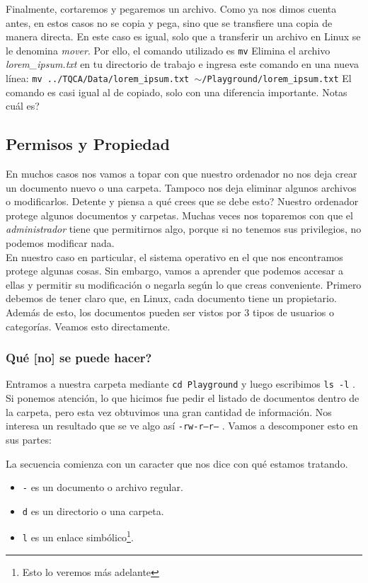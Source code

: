 \documentclass[10pt,letterpaper]{article}
\newcommand{\inlinecode}[1]{
\colorbox{light-gray}{\texttt{#1}}
}
\begin{document}
Finalmente, cortaremos y pegaremos un archivo. Como ya nos dimos cuenta antes, en estos casos no se copia y pega, sino que se transfiere una copia de manera directa. En este caso es igual, solo que a transferir un archivo en Linux se le denomina \emph{mover}. Por ello, el comando utilizado es \inlinecode{mv} Elimina el archivo \emph{lorem\_ipsum.txt} en tu directorio de trabajo e ingresa este comando en una nueva l\'inea: \inlinecode{mv ../TQCA/Data/lorem\_ipsum.txt $ \sim $/Playground/lorem\_ipsum.txt} El comando es casi igual al de copiado, solo con una diferencia importante. Notas cu\'al es?

\subsection{Permisos y Propiedad}
En muchos casos nos vamos a topar con que nuestro ordenador no nos deja crear un documento nuevo o una carpeta. Tampoco nos deja eliminar algunos archivos o modificarlos. Detente y piensa a qu\'e crees que se debe esto? Nuestro ordenador protege algunos documentos y carpetas. Muchas veces nos toparemos con que el \emph{administrador} tiene que permitirnos algo, porque si no tenemos sus privilegios, no podemos modificar nada.\\

En nuestro caso en particular, el sistema operativo en el que nos encontramos protege algunas cosas. Sin embargo, vamos a aprender que podemos accesar a ellas y permitir su modificaci\'on o negarla seg\'un lo que creas conveniente. Primero debemos de tener claro que, en Linux, cada documento tiene un propietario. Adem\'as de esto, los documentos pueden ser vistos por 3 tipos de usuarios o categor\'ias. Veamos esto directamente.

\subsubsection{Qu\'e [no] se puede hacer?}
Entramos a nuestra carpeta mediante \inlinecode{cd Playground} y luego escribimos \inlinecode{ls -l}. Si ponemos atenci\'on, lo que hicimos fue pedir el listado de documentos dentro de la carpeta, pero esta vez obtuvimos una gran cantidad de informaci\'on. Nos interesa un resultado que se ve algo as\'i \inlinecode{-rw-r--r--}. Vamos a descomponer esto en sus partes:

La secuencia comienza con un caracter que nos dice con qu\'e estamos tratando.
\begin{itemize}
\item \inlinecode{-} es un documento o archivo regular.
\item \inlinecode{d} es un directorio o una carpeta.
\item \inlinecode{l} es un enlace simb\'olico\footnote{Esto lo veremos m\'as adelante}.
\end{itemize}
\end{document}
